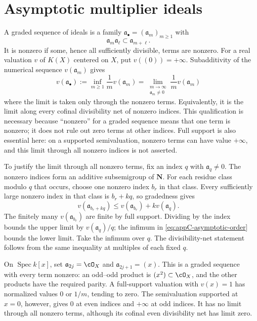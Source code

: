 \section{Asymptotic multiplier ideals}
\label{sec:appC-asymptotic-multiplier}

\begin{definition}
\label{def:appC-graded-sequence}
A graded sequence of ideals is a family
\(\mathfrak a_\bullet=(\mathfrak a_m)_{m\geq1}\) with
\[
 \mathfrak a_m\mathfrak a_\ell
 \subset\mathfrak a_{m+\ell}.
\tag{C.13}\label{eq:appC-graded-sequence}
\]
It is nonzero if some, hence all sufficiently divisible, terms are nonzero.
For a real valuation \(v\) of \(K(X)\) centered on \(X\),
put \(v((0))=+\infty\).  Subadditivity of the numerical sequence
\(v(\mathfrak a_m)\) gives
\[
 v(\mathfrak a_\bullet)
 :=\inf_{m\geq1}\frac1m v(\mathfrak a_m)
 =\lim_{\substack{m\to\infty\\ \mathfrak a_m\ne0}}
       \frac1m v(\mathfrak a_m)
\tag{C.14}\label{eq:appC-asymptotic-order}
\]
where the limit is taken only through the nonzero terms.  Equivalently,
it is the limit along every cofinal divisibility net of nonzero indices.
This qualification is necessary because ``nonzero'' for a graded
sequence means that one term is nonzero; it does not rule out zero terms
at other indices.  Full support is also essential here: on a supported
semivaluation, nonzero terms can have value \(+\infty\), and this limit
through all nonzero indices is not asserted.
\end{definition}

To justify the limit through all nonzero terms, fix an index \(q\) with
\(\mathfrak a_q\ne0\).  The nonzero indices form an additive subsemigroup
of \(\mathbf N\).  For each residue class modulo \(q\) that occurs,
choose one nonzero index \(b_r\) in that class.  Every sufficiently large
nonzero index in that class is \(b_r+kq\), so gradedness gives
\[
 v(\mathfrak a_{b_r+kq})
      \leq v(\mathfrak a_{b_r})+k v(\mathfrak a_q).
\]
The finitely many \(v(\mathfrak a_{b_r})\) are finite by full support.
Dividing by the index bounds the upper limit by
\(v(\mathfrak a_q)/q\); the infimum in
\eqref{eq:appC-asymptotic-order} bounds the lower limit.  Take the infimum
over \(q\).  The divisibility-net statement follows from the same
inequality at multiples of each fixed \(q\).

\begin{example}
\label{ex:appC-supported-graded-limit}
On \(\operatorname{Spec}k[x]\), set \(\mathfrak a_{2j}=\cO_X\)
and \(\mathfrak a_{2j+1}=(x)\).  This is a graded sequence with every
term nonzero: an odd--odd product is \((x^2)\subset\cO_X\), and the
other products have the required parity.  A full-support valuation with
\(v(x)=1\) has normalized values \(0\) or \(1/m\), tending to zero.
The semivaluation supported at \(x=0\), however, gives \(0\) at even
indices and \(+\infty\) at odd indices.  It has no limit through all
nonzero terms, although its cofinal even divisibility net has limit zero.
\end{example}

